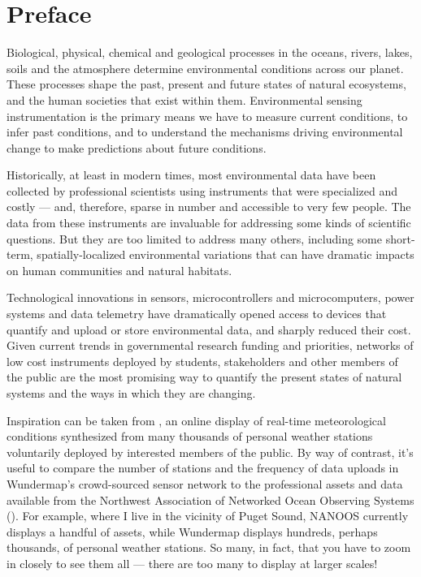 \setchapterpreamble[u]{\margintoc}
\chapter*{Preface}

Biological, physical, chemical and geological processes in the oceans, rivers, lakes, soils and the atmosphere determine environmental conditions across our planet. 
These processes shape the past, present and future states of natural ecosystems, and the human societies that exist within them. 
Environmental sensing instrumentation is the primary means we have to measure current conditions, to infer past conditions, and to understand the mechanisms driving environmental change to make predictions about future conditions. 

Historically, at least in modern times, most environmental data have been collected by professional scientists using instruments that were specialized and costly --- and, therefore, sparse in number and accessible to very few people.
The data from these instruments are invaluable for addressing some kinds of scientific questions. 
But they are too limited to address many others, including some short-term, spatially-localized environmental variations that can have dramatic impacts on human communities and natural habitats.

Technological innovations in sensors, microcontrollers and microcomputers, power systems and data telemetry have dramatically opened access to devices that quantify and upload or store environmental data, and sharply reduced their cost.
Given current trends in governmental research funding and priorities, networks of low cost instruments deployed by students, stakeholders and other members of the public are the most promising way to quantify the present states of natural systems and the ways in which they are changing. 

Inspiration can be taken from , an online display of real-time meteorological conditions synthesized from many thousands of personal weather stations voluntarily deployed by interested members of the public. 
By way of contrast, it's useful to compare the number of stations and the frequency of data uploads in Wundermap's crowd-sourced sensor network to the professional assets and data available from the Northwest Association of Networked Ocean Observing Systems (). 
For example, where I live in the vicinity of Puget Sound, NANOOS currently displays a handful of assets, while Wundermap displays hundreds, perhaps thousands, of personal weather stations. 
So many, in fact, that you have to zoom in closely to see them all --- there are too many to display at larger scales!

